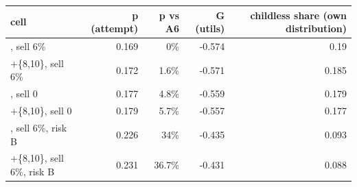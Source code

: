\begin{tabular}{lrrrr}
\toprule
cell & p (attempt) & p vs A6 & G (utils) & childless share (own distribution) \\
\midrule
[0,6], sell 6\% & 0.169 & 0\% & -0.574 & 0.19 \\
[0,6]+\{8,10\}, sell 6\% & 0.172 & 1.6\% & -0.571 & 0.185 \\
[0,6], sell 0 & 0.177 & 4.8\% & -0.559 & 0.179 \\
[0,6]+\{8,10\}, sell 0 & 0.179 & 5.7\% & -0.557 & 0.177 \\
[0,6], sell 6\%, risk B & 0.226 & 34\% & -0.435 & 0.093 \\
[0,6]+\{8,10\}, sell 6\%, risk B & 0.231 & 36.7\% & -0.431 & 0.088 \\
\bottomrule
\end{tabular}
